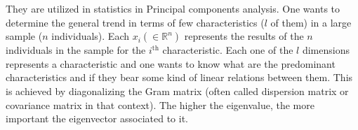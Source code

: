 \documentclass[12pt]{article}
\begin{document}
They are utilized in statistics in Principal components analysis. One wants to determine the general trend in terms of few characteristics ($l$ of them) in a large sample ($n$ individuals). Each $x_i (\in {\mathbb R}^n)$ represents the results of the $n$ individuals in the sample for the $i^\mathrm{th}$ characteristic. Each one of the $l$ dimensions represents a characteristic and one wants to know what are the predominant characteristics and if they bear some kind of linear relations between them. This is achieved by diagonalizing the Gram matrix (often called dispersion matrix or covariance matrix in that context). The higher the eigenvalue, the more important the eigenvector associated to it.
\end{document}

